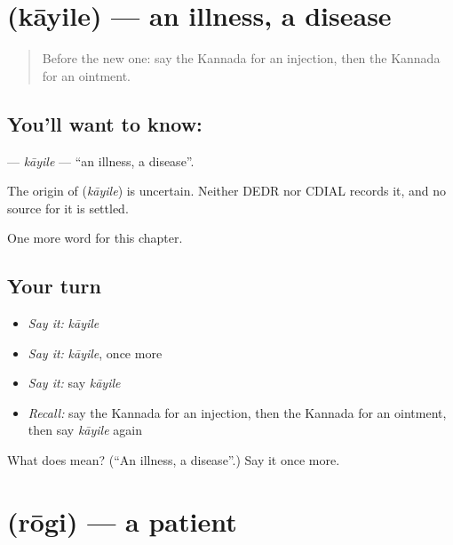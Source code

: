 \section[\texorpdfstring{\kn{ಕಾಯಿಲೆ} (kāyile)}{ಕಾಯಿಲೆ (kāyile)}]{ (kāyile) — an illness, a disease}

\label{lesson:KA-C208-kayile}



\begin{quote}
Before the new one: say the Kannada for an injection, then the Kannada for an ointment.
\end{quote}

\subsection*{You'll want to know: }
\textbf{} — \emph{kāyile} — \textquotedblleft{}an illness, a disease\textquotedblright{}.

\begin{cousinweb}
The origin of \textbf{} (\emph{kāyile}) is uncertain. Neither DEDR nor CDIAL records it, and no source for it is settled.
\end{cousinweb}

\begin{grammarlens}[title={What you've built}]
One more word for this chapter.
\end{grammarlens}

\subsection*{Your turn}
\begin{itemize}
\raggedright
  \item \emph{Say it:} \emph{kāyile}
  \item \emph{Say it:} \emph{kāyile}, once more
  \item \emph{Say it:} say \emph{kāyile}
  \item \emph{Recall:} say the Kannada for an injection, then the Kannada for an ointment, then say \emph{kāyile} again
\end{itemize}

\begin{tcolorbox}[breakable,colback=teal!4,colframe=teal!35!black,title={Before you move on}]
What does  mean? (\textquotedblleft{}An illness, a disease\textquotedblright{}.) Say it once more.
\end{tcolorbox}
\section[\texorpdfstring{\kn{ರೋಗಿ} (rōgi)}{ರೋಗಿ (rōgi)}]{ (rōgi) — a patient}

